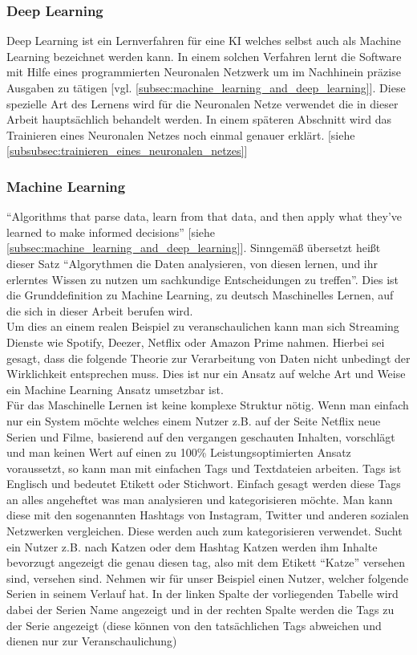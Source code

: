         \subsubsection{Deep Learning}
        \label{subsubsec:deep_learning}
            Deep Learning ist ein Lernverfahren für eine KI welches selbst auch als Machine Learning bezeichnet werden kann. In einem solchen Verfahren lernt die Software mit Hilfe eines programmierten Neuronalen Netzwerk um im Nachhinein präzise Ausgaben zu tätigen [vgl. \ref{subsec:machine_learning_and_deep_learning}]. Diese spezielle Art des Lernens wird für die Neuronalen Netze verwendet die in dieser Arbeit hauptsächlich behandelt werden. In einem späteren Abschnitt wird das Trainieren eines Neuronalen Netzes noch einmal genauer erklärt. [siehe \ref{subsubsec:trainieren_eines_neuronalen_netzes}]

        \subsubsection{Machine Learning}
        \label{subsubsec:machnine_learning}
            \enquote{Algorithms that parse data, learn from that data, and then apply what they’ve learned to make informed decisions} [siehe \ref{subsec:machine_learning_and_deep_learning}]. Sinngemäß übersetzt heißt dieser Satz \enquote{Algorythmen die Daten analysieren, von diesen lernen, und ihr erlerntes Wissen zu nutzen um sachkundige Entscheidungen zu treffen}. Dies ist die Grunddefinition zu Machine Learning, zu deutsch Maschinelles Lernen, auf die sich in dieser Arbeit berufen wird.\\
            Um dies an einem realen Beispiel zu veranschaulichen kann man sich Streaming Dienste wie Spotify, Deezer, Netflix oder Amazon Prime nahmen. Hierbei sei gesagt, dass die folgende Theorie zur Verarbeitung von Daten nicht unbedingt der Wirklichkeit entsprechen muss. Dies ist nur ein Ansatz auf welche Art und Weise ein Machine Learning Ansatz umsetzbar ist.\\

            Für das Maschinelle Lernen ist keine komplexe Struktur nötig. Wenn man einfach nur ein System möchte welches einem Nutzer z.B. auf der Seite Netflix neue Serien und Filme, basierend auf den vergangen geschauten Inhalten, vorschlägt und man keinen Wert auf einen zu 100\% Leistungsoptimierten Ansatz voraussetzt, so kann man mit einfachen Tags und Textdateien arbeiten. Tags ist Englisch und bedeutet Etikett oder Stichwort. Einfach gesagt werden diese Tags an alles angeheftet was man analysieren und kategorisieren möchte. Man kann diese mit den sogenannten Hashtags von Instagram, Twitter und anderen sozialen Netzwerken vergleichen. Diese werden auch zum kategorisieren verwendet. Sucht ein Nutzer z.B. nach Katzen oder dem Hashtag Katzen werden ihm Inhalte bevorzugt angezeigt die genau diesen tag, also mit dem Etikett \enquote{Katze} versehen sind, versehen sind. Nehmen wir für unser Beispiel einen Nutzer, welcher folgende Serien in seinem Verlauf hat. In der linken Spalte der vorliegenden Tabelle wird dabei der Serien Name angezeigt und in der rechten Spalte werden die Tags zu der Serie angezeigt (diese können von den tatsächlichen Tags abweichen und dienen nur zur Veranschaulichung)
            
